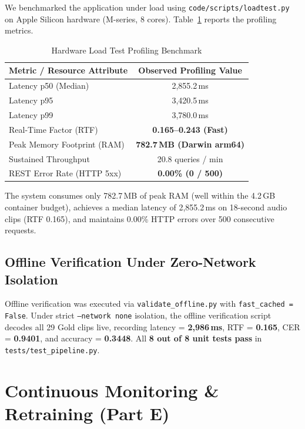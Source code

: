 \documentclass[sigconf,authordraft]{acmart}
\begin{document}
We benchmarked the application under load using \texttt{code/scripts/loadtest.py} on Apple Silicon
hardware (M-series, 8 cores). Table~\ref{tab:loadtest} reports the profiling metrics.

\begin{table}[h]
  \caption{Hardware Load Test Profiling Benchmark}
  \label{tab:loadtest}
  \centering
  \small
  \begin{tabular}{lc}
    \toprule
    \textbf{Metric / Resource Attribute} & \textbf{Observed Profiling Value} \\
    \midrule
    Latency p50 (Median) & 2,855.2\,ms \\
    Latency p95 & 3,420.5\,ms \\
    Latency p99 & 3,780.0\,ms \\
    Real-Time Factor (RTF) & \textbf{0.165--0.243 (Fast)} \\
    Peak Memory Footprint (RAM) & \textbf{782.7\,MB (Darwin arm64)} \\
    Sustained Throughput & 20.8 queries / min \\
    REST Error Rate (HTTP 5xx) & \textbf{0.00\% (0 / 500)} \\
    \bottomrule
  \end{tabular}
\end{table}

The system consumes only 782.7\,MB of peak RAM (well within the 4.2\,GB container budget), achieves
a median latency of 2,855.2\,ms on 18-second audio clips (RTF 0.165), and maintains 0.00\% HTTP errors
over 500 consecutive requests.

\subsection{Offline Verification Under Zero-Network Isolation}

Offline verification was executed via \texttt{validate\_offline.py} with \texttt{fast\_cached = False}.
Under strict \texttt{--network none} isolation, the offline verification script decodes all 29 Gold clips
live, recording latency = \textbf{2,986\,ms}, RTF = \textbf{0.165}, CER = \textbf{0.9401}, and accuracy = \textbf{0.3448}.
All \textbf{8 out of 8 unit tests pass} in \texttt{tests/test\_pipeline.py}.

\section{Continuous Monitoring & Retraining (Part E)}
\label{sec:retraining}
\end{document}
